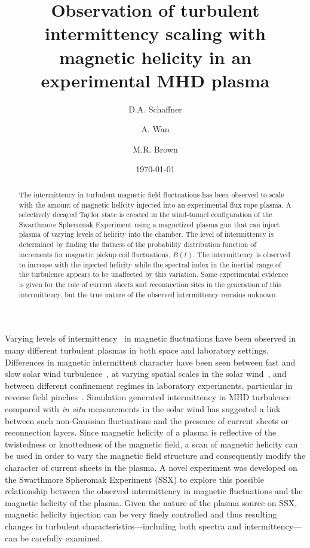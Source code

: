 \documentclass[aip,prl,amsmath,amssymb,reprint,superscriptaddress]{revtex4-1} %
\begin{document}
\title{Observation of turbulent intermittency scaling with magnetic helicity in an experimental MHD plasma}

\author{D.A. Schaffner}
\author{A. Wan}
\author{M.R. Brown}
\date{\today}
\begin{abstract}
The intermittency in turbulent magnetic field fluctuations has been observed to scale with the amount of magnetic helicity injected into an experimental flux rope plasma. A selectively decayed Taylor state is created in the wind-tunnel configuration of the Swarthmore Spheromak Experiment using a magnetized plasma gun that can inject plasma of varying levels of helicity into the chamber. The level of intermittency is determined by finding the flatness of the probability distribution function of increments for magnetic pickup coil fluctuations, $\dot{B}(t)$. The intermittency is observed to increase with the injected helicity while the spectral index in the inertial range of the turbulence appears to be unaffected by this variation. Some experimental evidence is given for the role of current sheets and reconnection sites in the generation of this intermittency, but the true nature of the observed intermittency remains unknown.
\end{abstract}

\maketitle

Varying levels of intermittency~\cite{frisch95} in magnetic fluctuations have been observed in many different turbulent plasmas in both space and laboratory settings. Differences in magnetic intermittent character have been seen between fast and slow solar wind turbulence~\cite{sorrisovalvo99}, at varying spatial scales in the solar wind~\cite{wan12}, and between different confinement regimes in laboratory experiments, particular in reverse field pinches~\cite{sorrisovalvo01,marrelli05}. Simulation generated intermittency in MHD turbulence~\cite{Greco08,Greco09,Wan09,Servidio11b} compared with {\it in situ} measurements in the solar wind has suggested a link between such non-Gaussian fluctuations and the presence of current sheets or reconnection layers. Since magnetic helicity of a plasma is reflective of the twistedness or knottedness of the magnetic field, a scan of magnetic helicity can be used in order to vary the magnetic field structure and consequently modify the character of current sheets in the plasma. A novel experiment was developed on the Swarthmore Spheromak Experiment (SSX) to explore this possible relationship between the observed intermittency in magnetic fluctuations and the magnetic helicity of the plasma. Given the nature of the plasma source on SSX, magnetic helicity injection can be very finely controlled and thus resulting changes in turbulent characteristics---including both spectra and intermittency---can be carefully examined.
\end{document}
